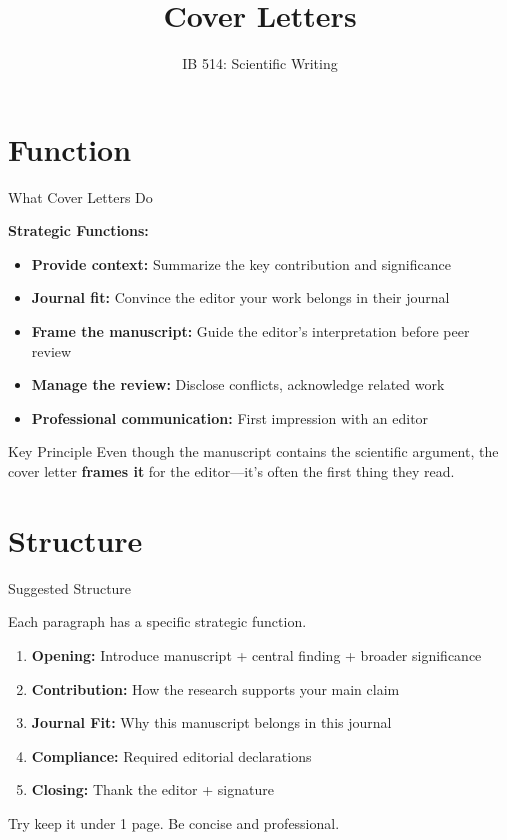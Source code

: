 \documentclass{beamer}
\title{Cover Letters}
\author[]{IB 514: Scientific Writing}
\date[]{}
\begin{document}
\begin{frame}
  \titlepage
\end{frame}


\section{Function}
\begin{frame}{What Cover Letters Do}

  \footnotesize
  \textbf{Strategic Functions:}
  \begin{itemize}
    \item \textbf{Provide context:} Summarize the key contribution and significance
    \item \textbf{Journal fit:} Convince the editor your work belongs in their journal
    \item \textbf{Frame the manuscript:} Guide the editor's interpretation before peer review
    \item \textbf{Manage the review:} Disclose conflicts, acknowledge related work
    \item \textbf{Professional communication:} First impression with an editor
  \end{itemize}

  \medskip
  \begin{block}{Key Principle}
    Even though the manuscript contains the scientific argument, the cover letter
    \textbf{frames it} for the editor---it's often the first thing they read.
  \end{block}

\end{frame}


\section{Structure}
\begin{frame}{Suggested Structure}


  Each paragraph has a specific strategic function.

  \medskip

  \begin{enumerate}
    \item \textbf{Opening:} Introduce manuscript + central finding + broader significance
    \item \textbf{Contribution:} How the research supports your main claim
    \item \textbf{Journal Fit:} Why this manuscript belongs in this journal
    \item \textbf{Compliance:} Required editorial declarations
    \item \textbf{Closing:} Thank the editor + signature
  \end{enumerate}

  \medskip

  Try keep it under 1 page. Be concise and professional.

\end{frame}
\end{document}
